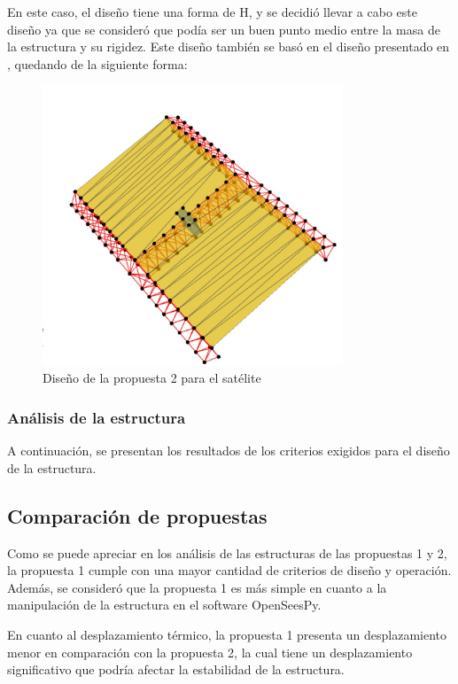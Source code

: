 En este caso, el diseño tiene una forma de H, y se decidió llevar a cabo este diseño ya que se consideró que podía ser un buen punto medio entre la masa de la estructura y su rigidez. Este diseño también se basó en el diseño presentado en \cite{hoyt2014trusselator}, quedando de la siguiente forma:

\begin{figure}[H]
    \centering
    \includegraphics[width=0.8\textwidth]{GRAFICOS_DISENO_BENO/propuesta2.png}
    \caption{Diseño de la propuesta 2 para el satélite}
    \label{fig:propuesta2}
\end{figure}

\subsubsection{Análisis de la estructura}

A continuación, se presentan los resultados de los criterios exigidos para el diseño de la estructura.

\subsection{Comparación de propuestas}

Como se puede apreciar en los análisis de las estructuras de las propuestas 1 y 2, la propuesta 1 cumple con una mayor cantidad de criterios de diseño y operación. Además, se consideró que la propuesta 1 es más simple en cuanto a la manipulación de la estructura en el software OpenSeesPy. 

En cuanto al desplazamiento térmico, la propuesta 1 presenta un desplazamiento menor en comparación con la propuesta 2, la cual tiene un desplazamiento significativo que podría afectar la estabilidad de la estructura.

